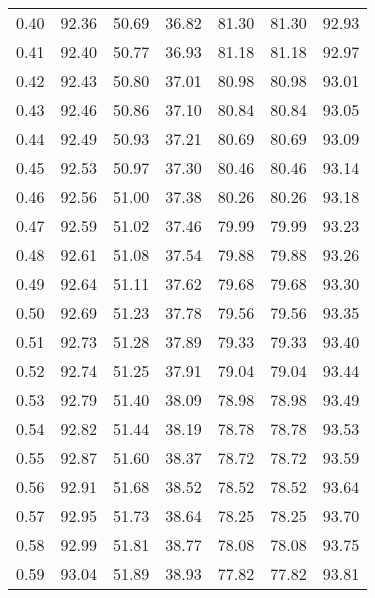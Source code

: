 \begin{tabular}{|c|c|c|c|c|c|c|}
      0.40 &     92.36 &     50.69 &      36.82 &   81.30 &      81.30 &         92.93 \\
      0.41 &     92.40 &     50.77 &      36.93 &   81.18 &      81.18 &         92.97 \\
      0.42 &     92.43 &     50.80 &      37.01 &   80.98 &      80.98 &         93.01 \\
      0.43 &     92.46 &     50.86 &      37.10 &   80.84 &      80.84 &         93.05 \\
      0.44 &     92.49 &     50.93 &      37.21 &   80.69 &      80.69 &         93.09 \\
      0.45 &     92.53 &     50.97 &      37.30 &   80.46 &      80.46 &         93.14 \\
      0.46 &     92.56 &     51.00 &      37.38 &   80.26 &      80.26 &         93.18 \\
      0.47 &     92.59 &     51.02 &      37.46 &   79.99 &      79.99 &         93.23 \\
      0.48 &     92.61 &     51.08 &      37.54 &   79.88 &      79.88 &         93.26 \\
      0.49 &     92.64 &     51.11 &      37.62 &   79.68 &      79.68 &         93.30 \\
      0.50 &     92.69 &     51.23 &      37.78 &   79.56 &      79.56 &         93.35 \\
      0.51 &     92.73 &     51.28 &      37.89 &   79.33 &      79.33 &         93.40 \\
      0.52 &     92.74 &     51.25 &      37.91 &   79.04 &      79.04 &         93.44 \\
      0.53 &     92.79 &     51.40 &      38.09 &   78.98 &      78.98 &         93.49 \\
      0.54 &     92.82 &     51.44 &      38.19 &   78.78 &      78.78 &         93.53 \\
      0.55 &     92.87 &     51.60 &      38.37 &   78.72 &      78.72 &         93.59 \\
      0.56 &     92.91 &     51.68 &      38.52 &   78.52 &      78.52 &         93.64 \\
      0.57 &     92.95 &     51.73 &      38.64 &   78.25 &      78.25 &         93.70 \\
      0.58 &     92.99 &     51.81 &      38.77 &   78.08 &      78.08 &         93.75 \\
      0.59 &     93.04 &     51.89 &      38.93 &   77.82 &      77.82 &         93.81 \\

\end{tabular}

